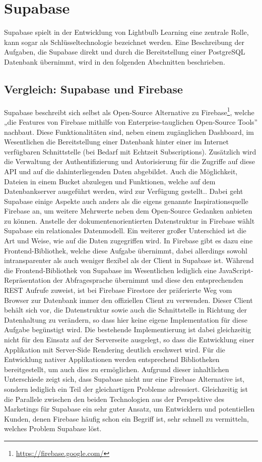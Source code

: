 \section{Supabase}
Supabase spielt in der Entwicklung von Lightbulb Learning eine zentrale Rolle, kann sogar als Schlüsseltechnologie bezeichnet werden. Eine Beschreibung der Aufgaben, die Supabase direkt und durch die Bereitstellung einer PostgreSQL Datenbank übernimmt, wird in den folgenden Abschnitten beschrieben.

\subsection{Vergleich: Supabase und Firebase}
Supabase beschreibt sich selbst als Open-Source Alternative zu Firebase\footnote{\url{https://firebase.google.com/}}, welche „die Features von Firebase mithilfe von Enterprise-tauglichen Open-Source Tools”\cite{supabase} nachbaut. Diese Funktionalitäten sind, neben einem zugänglichen Dashboard, im Wesentlichen die Bereitstellung einer Datenbank hinter einer im Internet verfügbaren Schnittstelle (bei Bedarf mit Echtzeit Subscriptions). Zusätzlich wird die Verwaltung der Authentifizierung und Autorisierung für die Zugriffe auf diese API und auf die dahinterliegenden Daten abgebildet. Auch die Möglichkeit, Dateien in einem Bucket abzulegen und Funktionen, welche auf dem Datenbankserver ausgeführt werden, wird zur Verfügung gestellt.. Dabei geht Supabase einige Aspekte auch anders als die eigens genannte Inspirationsquelle Firebase an, um weitere Mehrwerte neben dem Open-Source Gedanken anbieten zu können. Anstelle der dokumentenorientierten Datenstruktur in Firebase wählt Supabase ein relationales Datenmodell. Ein weiterer großer Unterschied ist die Art und Weise, wie auf die Daten zugegriffen wird. In Firebase gibt es dazu eine Frontend-Bibliothek, welche diese Aufgabe übernimmt, dabei allerdings sowohl intransparenter als auch weniger flexibel als der Client in Supabase ist. Während die Frontend-Bibliothek von Supabase im Wesentlichen lediglich eine JavaScript-Repräsentation der Abfragesprache übernimmt und diese den entsprechenden REST Aufrufe zuweist, ist bei Firebase Firestore der präferierte Weg vom Browser zur Datenbank immer den offiziellen Client zu verwenden. Dieser Client behält sich vor, die Datenstruktur sowie auch die Schnittstelle in Richtung der Datenhaltung zu verändern, so dass hier keine eigene Implementation für diese Aufgabe begünstigt wird. Die bestehende Implementierung ist dabei gleichzeitig nicht für den Einsatz auf der Serverseite ausgelegt, so dass die Entwicklung einer Applikation mit Server-Side Rendering deutlich erschwert wird. Für die Entwicklung nativer Applikationen werden entsprechend Bibliotheken bereitgestellt, um auch dies zu ermöglichen. Aufgrund dieser inhaltlichen Unterschiede zeigt sich, dass Supabase nicht nur eine Firebase Alternative ist, sondern lediglich ein Teil der gleichartigen Probleme adressiert. Gleichzeitig ist die Parallele zwischen den beiden Technologien aus der Perspektive des Marketings für Supabase ein sehr guter Ansatz, um Entwicklern und potentiellen Kunden, denen Firebase häufig schon ein Begriff ist, sehr schnell zu vermitteln, welches Problem Supabase löst.
